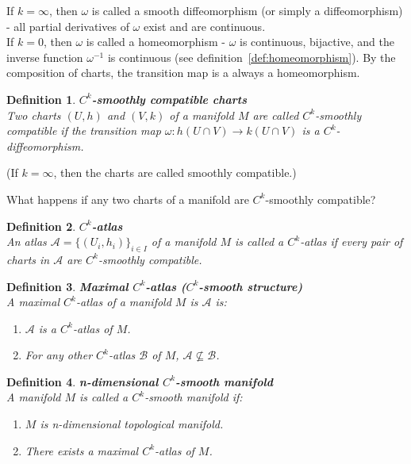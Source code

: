 \documentclass[11pt]{book} %
\newtheorem{definition}{Definition}[section]
\begin{document}
If $k = \infty$, then \( \omega \) is called a smooth diffeomorphism (or simply a diffeomorphism) - all partial derivatives of \( \omega \) exist and are continuous. \\
If $k = 0$, then \( \omega \) is called a homeomorphism - \( \omega \) is continuous, bijactive, 
and the inverse function \( \omega^{-1} \) is continuous (see definition~\ref{def:homeomorphism}). By the composition of charts, the transition map is a always a homeomorphism.

\begin{definition}{\textbf{$C^k$-smoothly compatible charts}} \\
    Two charts \( (U, h) \) and \( (V, k) \) of a manifold \( M \) are called \( C^k \)-smoothly compatible 
    if the transition map \( \omega: h(U \cap V) \to k(U \cap V) \) is a \( C^k \)-diffeomorphism.
\end{definition}

(If $k = \infty$, then the charts are called smoothly compatible.)

What happens if any two charts of a manifold are $C^k$-smoothly compatible?

\begin{definition}{\textbf{$C^k$-atlas}} \\
    An atlas \( \mathcal{A} = \{ (U_i, h_i) \}_{i \in I} \) of a manifold \( M \) is called a \( C^k \)-atlas 
    if every pair of charts in \( \mathcal{A} \) are \( C^k \)-smoothly compatible.
\end{definition}


\begin{definition}{\textbf{Maximal $C^k$-atlas ($C^k$-smooth structure)}} \\
    A maximal \( C^k \)-atlas of a manifold \( M \) is \( \mathcal{A} \) is:
    \begin{enumerate}
        \item \( \mathcal{A} \) is a \( C^k \)-atlas of \( M \).
        \item For any other \( C^k \)-atlas \( \mathcal{B} \) of \( M \), \( \mathcal{A} \nsubseteq \mathcal{B} \).
    \end{enumerate}
\end{definition}


\begin{definition}{\textbf{n-dimensional $C^k$-smooth manifold}} \\
    A manifold \( M \) is called a \( C^k \)-smooth manifold if: 
    \begin{enumerate}
        \item \( M \) is n-dimensional topological manifold.
        \item There exists a maximal \( C^k \)-atlas of \( M \).
    \end{enumerate}
\end{definition}
\end{document}
